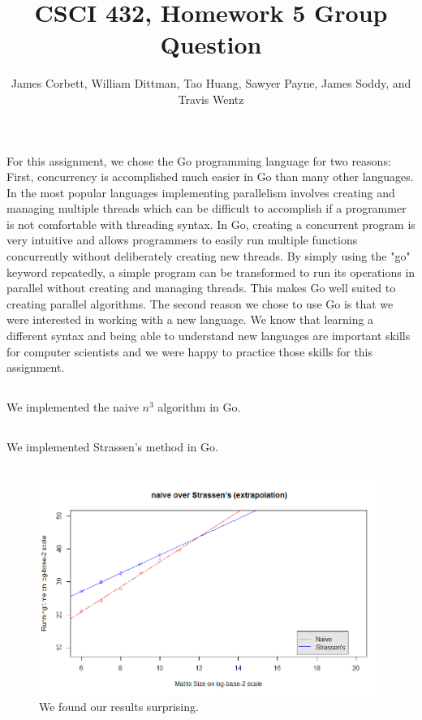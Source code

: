 \documentclass[11pt,twocolumn]{article}
\title{CSCI 432, Homework 5 Group Question}
\author{\small{ James Corbett, William Dittman, Tao Huang, Sawyer Payne, 
				James Soddy, and Travis Wentz}}
\begin{document}
\maketitle

\section{}

\subsection{} For this assignment, we chose the Go programming language for two reasons: First, concurrency is accomplished much easier in 
Go than many other languages. In the most popular languages 
implementing parallelism involves creating and managing multiple threads which can be 
difficult to accomplish if a programmer is not comfortable with threading syntax. In Go, 
creating a concurrent program is very intuitive and allows programmers to easily run 
multiple functions concurrently without deliberately creating new threads. By 
simply using the "go" keyword repeatedly, a simple program can be transformed to run 
its operations in parallel without creating and managing threads. This makes Go well suited
to creating parallel algorithms. The second 
reason we chose to use Go is that we were interested in working with a new language. We know that learning a different syntax and being able 
to understand new languages are important skills for computer scientists and we were 
happy to practice those skills for this assignment.

\subsection{} 
We implemented the naive $n^3$ algorithm in Go.

\subsection{}
 We implemented Strassen's method in Go.

\subsection{} 
\begin{figure}[h!]
\includegraphics[scale=.35]{graph.png}
  		\caption{We found our results surprising.}
\end{figure}
\end{document}
